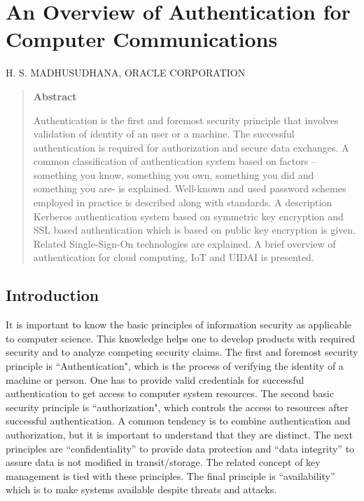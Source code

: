\chapter{An Overview of Authentication for Computer Communications}

\begin{center}
\uppercase{H. S. Madhusudhana, Oracle Corporation}
\end{center}


\newpage

\begin{multicols}{2}

\begin{quotation}
\centerline{\bf Abstract}
\medskip

\noindent
Authentication is the first and foremost security principle that involves validation of identity of an user or a machine. The successful authentication is required for authorization and secure data exchanges. A common classification of authentication system based on factors -- something you know, something you own, something you did and something you are- is explained. Well-known and used password schemes employed in practice is described along with standards. A description Kerberos authentication system based on symmetric key encryption and SSL based authentication which is based on public key encryption is given. Related Single-Sign-On technologies are explained. A brief overview of authentication for cloud computing, IoT and UIDAI is presented.
\end{quotation}


\section*{Introduction}

It is important to know the basic principles of information security as applicable to computer science. This knowledge helps one to develop products with required security and to analyze competing security claims. The first and foremost security principle is ``Authentication", which is the process of verifying the identity of a machine or person. One has to provide valid credentials for successful authentication to get access to computer system resources. The second basic security principle is ``authorization", which controls the access to resources after successful authentication. A common tendency is to combine authentication and authorization, but it is important to understand that they are distinct. The next principles are ``confidentiality'' to provide data protection and ``data integrity'' to assure data is not modified in transit/storage. The related concept of key management is tied with these principles. The final principle is ``availability'' which is to make systems available despite threats and attacks.


\end{multicols}
